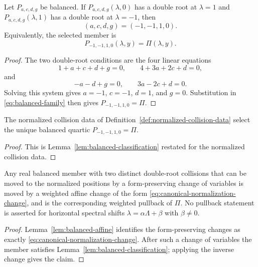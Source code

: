 \begin{lemma}\label{thm:balanced-classification}\label{lem:balanced-classification}
Let \(P_{a,c,d,g}\) be balanced.  If \(P_{a,c,d,g}(\lambda,0)\) has a double root at \(\lambda=1\) and \(P_{a,c,d,g}(\lambda,1)\) has a double root at \(\lambda=-1\), then
\begin{equation}\label{eq:canonical-normalization-equation}
(a,c,d,g)=(-1,-1,1,0).
\end{equation}
Equivalently, the selected member is
\begin{equation}\label{eq:canonical-normalization-parameters}
P_{-1,-1,1,0}(\lambda,y)=\Pi(\lambda,y).
\end{equation}
\end{lemma}
\begin{proof}
The two double-root conditions are the four linear equations
\[
1+a+c+d+g=0,
\qquad
4+3a+2c+d=0,
\]
and
\[
-a-d+g=0,
\qquad
3a-2c+d=0.
\]
Solving this system gives \(a=-1\), \(c=-1\), \(d=1\), and \(g=0\).  Substitution in \eqref{eq:balanced-family} then gives \(P_{-1,-1,1,0}=\Pi\).
\end{proof}

\begin{corollary}\label{cor:canonical-balanced-member}
The normalized collision data of Definition~\ref{def:normalized-collision-data} select the unique balanced quartic \(P_{-1,-1,1,0}=\Pi\).
\end{corollary}
\begin{proof}
This is Lemma~\ref{lem:balanced-classification} restated for the normalized collision data.
\end{proof}

\begin{corollary}\label{cor:canonical-specialization-up-to-normalization}
Any real balanced member with two distinct double-root collisions that can be moved to the normalized positions by a form-preserving change of variables is moved by a weighted affine change of the form \eqref{eq:canonical-normalization-change}, and is the corresponding weighted pullback of $\Pi$.  No pullback statement is asserted for horizontal spectral shifts \(\lambda=\alpha\Lambda+\beta\) with \(\beta\ne0\).
\end{corollary}
\begin{proof}
Lemma~\ref{lem:balanced-affine} identifies the form-preserving changes as exactly \eqref{eq:canonical-normalization-change}.  After such a change of variables the member satisfies Lemma~\ref{lem:balanced-classification}; applying the inverse change gives the claim.
\end{proof}

